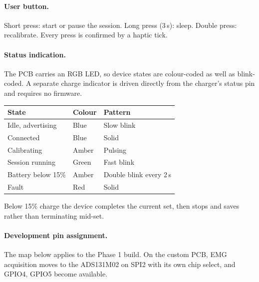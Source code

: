 \documentclass[11pt]{article}
\begin{document}
\paragraph{User button.} Short press: start or pause the session. Long press
(3\,s): sleep. Double press: recalibrate. Every press is confirmed by a haptic
tick.

\paragraph{Status indication.} The PCB carries an RGB LED, so device states are
colour-coded as well as blink-coded. A separate charge indicator is driven
directly from the charger's status pin and requires no firmware.

\begin{table}[H]
\centering\small
\begin{tabularx}{\linewidth}{@{}p{34mm} p{30mm} X@{}}
\toprule
\textbf{State} & \textbf{Colour} & \textbf{Pattern} \\
\midrule
Idle, advertising & Blue & Slow blink \\
Connected & Blue & Solid \\
Calibrating & Amber & Pulsing \\
Session running & Green & Fast blink \\
Battery below 15\% & Amber & Double blink every 2\,s \\
Fault & Red & Solid \\
\bottomrule
\end{tabularx}
\end{table}

\noindent
Below 15\% charge the device completes the current set, then stops and saves
rather than terminating mid-set.

\paragraph{Development pin assignment.} The map below applies to the Phase 1
build. On the custom PCB, EMG acquisition moves to the ADS131M02 on SPI2 with
its own chip select, and GPIO4, GPIO5 become available.
\end{document}
